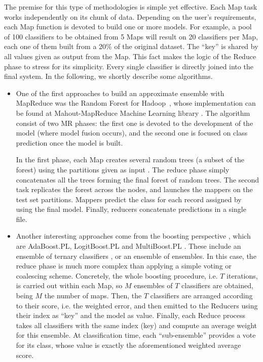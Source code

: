 \documentclass[3p,review]{elsarticle}
\begin{document}
	The premise for this type of methodologies is simple yet effective. Each Map task works independently on its chunk of data. Depending on the user's requirements, each Map function is devoted to build one or more models. For example, a pool of 100 classifiers to be obtained from 5 Maps will result on 20 classifiers per Map, each one of them built from a 20\% of the original dataset. The ``key'' is shared by all values given as output from the Map. This fact makes the logic of the Reduce phase to stress for its simplicity. Every single classifier is directly joined into the final system. In the following, we shortly describe some algorithms. 
	
	\begin{itemize}
		\item One of the first approaches to build an approximate ensemble with MapReduce was the Random Forest for Hadoop~\cite{Assun13-RF-H,Wang13-RF-H}, whose implementation can be found at Mahout-MapReduce Machine Learning library \cite{Owe11, Mahout17}. The algorithm consist of two MR phases: the first one is devoted to the development of the model (where model fusion occurs), and the second one is focused on class prediction once the model is built.
		
		In the first phase, each Map creates several random trees (a subset of the forest) using the partitions given as input \cite{Rokach16}. The reduce phase simply concatenates all the trees forming the final forest of random trees. The second task replicates the forest across the nodes, and launches the mappers on the test set partitions. Mappers predict the class for each record assigned by using the final model. Finally, reducers concatenate predictions in a single file.
		
		
		
		\item Another interesting approaches come from the boosting perspective \cite{schapire99brief}, which are AdaBoost.PL, LogitBoost.PL and MultiBoost.PL \cite{Palit12-Boost}. These include an ensemble of ternary classifiers \cite{schapire99confidence}, or an ensemble of ensembles. In this case, the reduce phase is much more complex than applying a simple voting or coalescing scheme. Concretely, the whole boosting procedure, i.e. $T$ iterations, is carried out within each Map, so $M$ ensembles of $T$ classifiers are obtained, being $M$ the number of maps. Then, the $T$ classifiers are arranged according to their score, i.e. the weighted error, and then emitted to the Reducers using their index as ``key'' and the model as value. Finally, each Reduce process takes all classifiers with the same index (key) and compute an average weight for this ensemble. At classification time, each ``sub-ensemble'' provides a vote for its class, whose value is exactly the aforementioned weighted average score.  
		

\end{itemize}
\end{document}
